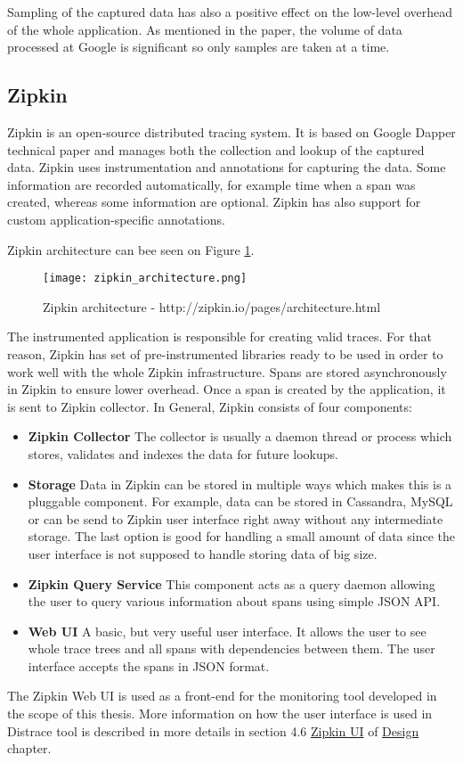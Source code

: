 Sampling of the captured data has also a positive effect on the low-level overhead of the whole application. As mentioned in the paper, the volume of data processed at Google is significant so only samples are taken at a time.

\subsection{Zipkin}
\label{zipkin}
Zipkin is an open-source distributed tracing system. It is based on Google Dapper technical paper and manages both the collection and lookup of the captured data. Zipkin uses instrumentation and annotations for capturing the data. Some
information are recorded automatically, for example time when a span was created, whereas some information are optional. Zipkin has also support for custom application-specific annotations.

Zipkin architecture can bee seen on Figure \ref{fig:zipkin_architecture}.
\begin{figure}
	\centering
	\texttt{[image: zipkin\_architecture.png]}
	\caption{Zipkin architecture - http://zipkin.io/pages/architecture.html}
	\label{fig:zipkin_architecture}
\end{figure}
The instrumented application is responsible for creating valid traces. For that reason, Zipkin has set of pre-instrumented libraries ready to be used in order to work well with the whole Zipkin infrastructure. Spans are stored asynchronously in Zipkin to ensure lower overhead. Once a span is created by the application, it is sent to Zipkin collector. In General, Zipkin consists of four components:
\begin{itemize}
	\item \textbf{Zipkin Collector} \newline
	The collector is usually a daemon thread or process which stores, validates and indexes the data for future lookups.
	\item\textbf{Storage} \newline
	Data in Zipkin can be stored in multiple ways which makes this is a pluggable component. For example, data can be stored in Cassandra, MySQL or can be send to Zipkin user interface right away without any intermediate storage. The last option is good for handling a small amount of data since the user interface is not supposed to handle storing data of big size.
	\item \textbf{Zipkin Query Service} \newline
	This component acts as a query daemon allowing the user to query various information about spans using simple JSON API.
	\item \textbf{Web UI} \newline
	A basic, but very useful user interface. It allows the user to see whole trace trees and all spans with dependencies between them. The user interface accepts the spans in JSON format.
\end{itemize}
The Zipkin Web UI is used as a front-end  for the monitoring tool developed in the scope of this thesis. More information on how the user interface is used in Distrace tool is described in more details in section 4.6 \hyperref[sec:zipkin_ui]{Zipkin UI} of \hyperref[chap:design]{Design} chapter.
